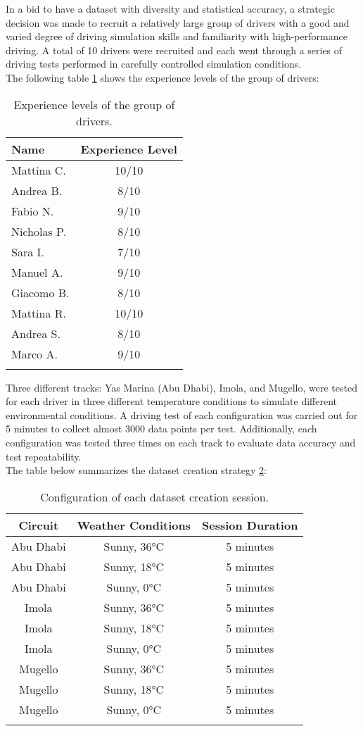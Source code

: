 \documentclass[a4paper,final,12pt]{report}
\begin{document}
In a bid to have a dataset with diversity and statistical accuracy, a strategic decision was made to recruit a relatively large group of drivers with a good and varied degree of driving simulation skills and familiarity with high-performance driving. A total of 10 drivers were recruited and each went through a series of driving tests performed in carefully controlled simulation conditions.\\

The following table \ref{tab:driver_experience} shows the experience levels of the group of drivers:

\begin{longtable}{|l|c|}
\hline
\textbf{Name} & \textbf{Experience Level} \\
\hline
Mattina C. & 10/10 \\
Andrea B. & 8/10 \\
Fabio N. & 9/10 \\
Nicholas P. & 8/10 \\
Sara I. & 7/10 \\
Manuel A. & 9/10 \\
Giacomo B. & 8/10 \\
Mattina R. & 10/10 \\
Andrea S. & 8/10 \\
Marco A. & 9/10 \\
\hline
\caption{Experience levels of the group of drivers.}
\label{tab:driver_experience}
\end{longtable}


Three different tracks: Yas Marina (Abu Dhabi), Imola, and Mugello, were tested for each driver in three different temperature conditions to simulate different environmental conditions. A driving test of each configuration was carried out for 5 minutes to collect almost 3000 data points per test. Additionally, each configuration was tested three times on each track to evaluate data accuracy and test repeatability.\\

The table below summarizes the dataset creation strategy \ref{tab:dataset_config}:

\begin{longtable}{|c|c|c|}
\hline
\textbf{Circuit} & \textbf{Weather Conditions} & \textbf{Session Duration} \\
\hline
Abu Dhabi & Sunny, 36°C & 5 minutes \\
Abu Dhabi & Sunny, 18°C & 5 minutes \\
Abu Dhabi & Sunny, 0°C  & 5 minutes \\
\hline
Imola & Sunny, 36°C & 5 minutes \\
Imola & Sunny, 18°C & 5 minutes \\
Imola & Sunny, 0°C  & 5 minutes \\
\hline
Mugello & Sunny, 36°C & 5 minutes \\
Mugello & Sunny, 18°C & 5 minutes \\
Mugello & Sunny, 0°C  & 5 minutes \\
\hline
\caption{Configuration of each dataset creation session.}
\label{tab:dataset_config}
\end{longtable}
\end{document}
